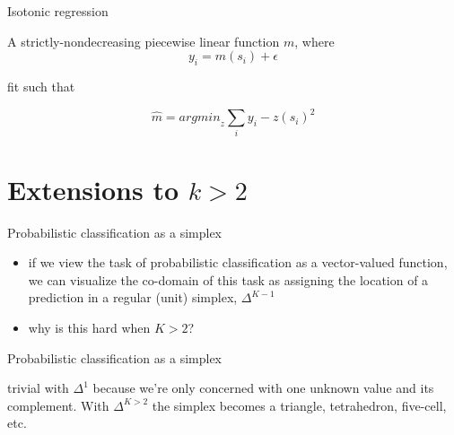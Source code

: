 \documentclass[ignorenonframetext,]{beamer}
\providecommand{\tightlist}{%
\setlength{\itemsep}{0pt}\setlength{\parskip}{0pt}}
\begin{document}
\begin{frame}{Isotonic regression}

A strictly-nondecreasing piecewise linear function \(m\), where
\[y_i = m(s_i) + \epsilon\]

fit such that

\[\hat{m} = {argmin}_z \sum_i{y_i-z(s_i) ^2}\]

\end{frame}

\section{\texorpdfstring{Extensions to
\(k > 2\)}{Extensions to k \textgreater{} 2}}\label{extensions-to-k-2}

\begin{frame}{Probabilistic classification as a simplex}

\begin{itemize}
\tightlist
\item
  if we view the task of probabilistic classification as a vector-valued
  function, we can visualize the co-domain of this task as assigning the
  location of a prediction in a regular (unit) simplex, \(\Delta^{K-1}\)
  \vspace{2mm}
\item
  why is this hard when \(K > 2\)?
\end{itemize}

\end{frame}

\begin{frame}{Probabilistic classification as a simplex}

\begin{figure}
\end{figure}

trivial with \(\Delta^{1}\) because we're only concerned with one
unknown value and its complement. With \(\Delta^{K>2}\) the simplex
becomes a triangle, tetrahedron, five-cell, etc.

\end{frame}
\end{document}
